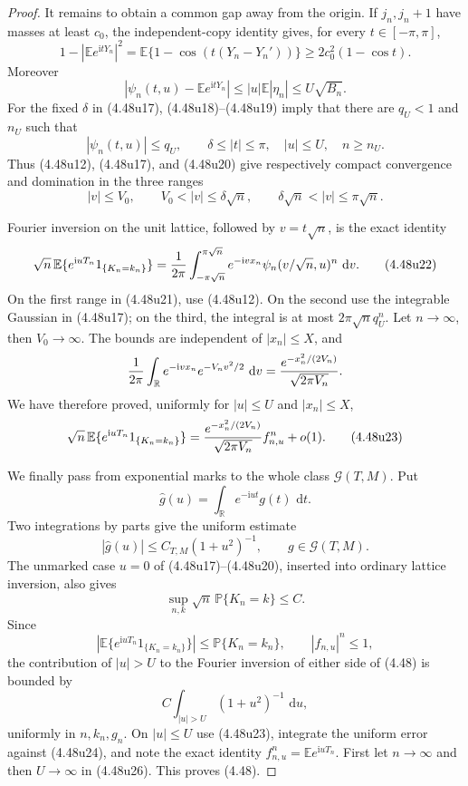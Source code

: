 \documentclass[11pt,a4paper]{article}
\numberwithin{equation}{section}
\theoremstyle{definition}
\theoremstyle{remark}
\newcommand{\E}{\mathbb E}
\newcommand{\Pp}{\mathbb P}
\newcommand{\ii}{\mathrm i}
\newcommand{\dd}{\,\mathrm d}
\begin{document}
\begin{proof}
It remains to obtain a common gap away from the origin.  If $j_n,j_n+1$
have masses at least $c_0$, the independent-copy identity gives, for every
$t\in[-\pi,\pi]$,
\[
 1-|\E e^{\ii tY_n}|^2
 =\E\{1-\cos(t(Y_n-Y_n'))\}
 \ge2c_0^2(1-\cos t).                                \tag{4.48u18}
\]
Moreover
\[
 |\psi_n(t,u)-\E e^{\ii tY_n}|
 \le |u|\E|\eta_n|\le U\sqrt{B_n}.                  \tag{4.48u19}
\]
For the fixed $\delta$ in (4.48u17), (4.48u18)--(4.48u19) imply that
there are $q_U<1$ and $n_U$ such that
\[
 |\psi_n(t,u)|\le q_U,\qquad
 \delta\le|t|\le\pi,\quad |u|\le U,\quad n\ge n_U.   \tag{4.48u20}
\]
Thus (4.48u12), (4.48u17), and (4.48u20) give respectively compact
convergence and domination in the three ranges
\[
 |v|\le V_0,\qquad
 V_0<|v|\le\delta\sqrt n,\qquad
 \delta\sqrt n<|v|\le\pi\sqrt n.                   \tag{4.48u21}
\]

Fourier inversion on the unit lattice, followed by $v=t\sqrt n$, is the
exact identity
\[
 \sqrt n\,\E\{e^{\ii uT_n}1_{\{K_n=k_n\}}\}
 ={1\over2\pi}\int_{-\pi\sqrt n}^{\pi\sqrt n}
 e^{-\ii vx_n}\psi_n(v/\sqrt n,u)^n\,\dd v.          \tag{4.48u22}
\]
On the first range in (4.48u21), use (4.48u12).  On the second use the
integrable Gaussian in (4.48u17); on the third, the integral is at most
$2\pi\sqrt n q_U^n$.  Let $n\to\infty$, then $V_0\to\infty$.  The bounds
are independent of $|x_n|\le X$, and
\[
 {1\over2\pi}\int_{\mathbb R}e^{-\ii vx_n}e^{-V_nv^2/2}\,\dd v
 ={e^{-x_n^2/(2V_n)}\over\sqrt{2\pi V_n}}.
\]
We have therefore proved, uniformly for $|u|\le U$ and $|x_n|\le X$,
\[
 \sqrt n\,\E\{e^{\ii uT_n}1_{\{K_n=k_n\}}\}
 ={e^{-x_n^2/(2V_n)}\over\sqrt{2\pi V_n}}f_{n,u}^n+o(1).
                                                               \tag{4.48u23}
\]

We finally pass from exponential marks to the whole class
$\mathscr G(T,M)$.  Put
\[
 \widehat g(u)=\int_{\mathbb R}e^{-\ii ut}g(t)\,\dd t.
\]
Two integrations by parts give the uniform estimate
\[
 |\widehat g(u)|\le C_{T,M}(1+u^2)^{-1},
 \qquad g\in\mathscr G(T,M).                          \tag{4.48u24}
\]
The unmarked case $u=0$ of (4.48u17)--(4.48u20), inserted into ordinary
lattice inversion, also gives
\[
 \sup_{n,k}\sqrt n\,\Pp\{K_n=k\}\le C.              \tag{4.48u25}
\]
Since
\[
 |\E\{e^{\ii uT_n}1_{\{K_n=k_n\}}\}|\le\Pp\{K_n=k_n\},
 \qquad |f_{n,u}|^n\le1,
\]
the contribution of $|u|>U$ to the Fourier inversion of either side of
(4.48) is bounded by
\[
 C\int_{|u|>U}(1+u^2)^{-1}\,\dd u,                   \tag{4.48u26}
\]
uniformly in $n,k_n,g_n$.  On $|u|\le U$ use (4.48u23), integrate the
uniform error against (4.48u24), and note the exact identity
$f_{n,u}^n=\E e^{\ii uT_n}$.  First let $n\to\infty$ and then
$U\to\infty$ in (4.48u26).  This proves (4.48).
\end{proof}
\end{document}
